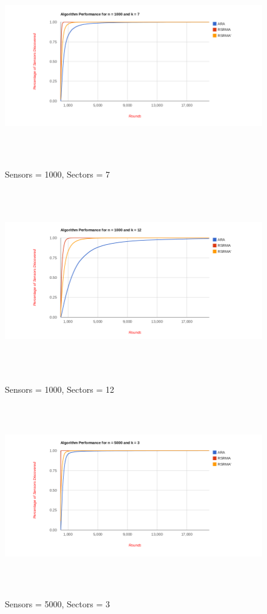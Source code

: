 \begin{figure}[ht]
\caption{Sensors = 1000, Sectors = 7}
\includegraphics[height = 8cm]{pics/graph1000k7.png}\\[0.5cm]   
\label{fig:n10k7} 
\end{figure}

\begin{figure}[ht]
\caption{Sensors = 1000, Sectors = 12}
\includegraphics[height = 8cm]{pics/graph1000k12.png}\\[0.5cm] 
\label{fig:n10k12}   
\end{figure}

\begin{figure}[ht]
\caption{Sensors = 5000, Sectors = 3}
\includegraphics[height = 8cm]{pics/graph5000k3.png}\\[0.5cm]    
\label{fig:n10k3}
\end{figure}

